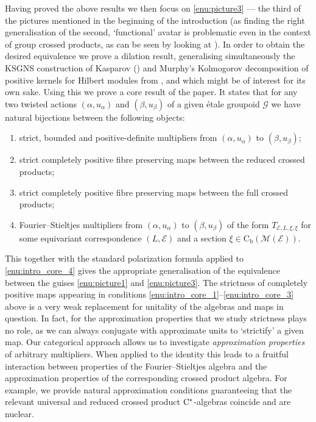\documentclass[11 pt, leqno]{amsart}
\numberwithin{equation}{section}
\theoremstyle{plain}
\theoremstyle{definition}
\newcommand*{\contb}{\mathrm{C_b}}%
\newcommand{\M}{\mathcal M}
\newcommand{\G}{\mathcal G} %
\newcommand{\EE}{\mathcal E}
\newcommand{\cst}{\ifmmode\mathrm{C}^*\else{$\mathrm{C}^*$}\fi}
\begin{document}
Having proved the above results we then focus on \ref{enu:picture3} --- the third of the pictures mentioned in the beginning of the introduction (as finding the right generalisation of the second, `functional' avatar is problematic even in the context of group crossed products, as can be seen by looking at \cite[Section 7.6]{Pedersen}). 
In order to obtain the desired equivalence we prove a dilation result, generalising simultaneously the KSGNS construction of Kasparov (\cite{Lance}) and Murphy's Kolmogorov decomposition of positive kernels for Hilbert modules from \cite{Mur}, and which might be of interest for its own sake. 
Using this we prove a core result of the paper.
It states that for any two twisted actions $(\alpha,u_{\alpha})$ and $(\beta, u_{\beta})$ of a given \'etale groupoid $\G$ we have natural bijections between the following objects: 
\begin{enumerate}
	\item\label{enu:intro_core_1} strict, bounded and positive-definite multipliers from $(\alpha,u_{\alpha})$ to $(\beta, u_{\beta})$;
    \item\label{enu:intro_core_2} strict completely positive fibre preserving maps between the reduced crossed products;
	\item\label{enu:intro_core_3} strict completely positive fibre preserving maps between the full crossed products;
	\item\label{enu:intro_core_4} Fourier--Stieltjes multipliers from $(\alpha,u_{\alpha})$ to $(\beta, u_{\beta})$ of the form $T_{\EE,L,\xi,\xi}$ %
	for some equivariant correspondence $(L,\EE)$ and a section $\xi\in \contb(\M(\EE))$.
\end{enumerate}	
This together with the standard polarization formula applied to \ref{enu:intro_core_4} gives  the appropriate generalisation of the equivalence between the guises \ref{enu:picture1} and \ref{enu:picture3}. 
The strictness of completely positive maps appearing in conditions \ref{enu:intro_core_1}--\ref{enu:intro_core_3} above is a very weak replacement for unitality of the algebras and maps in question. 
In fact, for the approximation properties that we study strictness plays no role, as we can always conjugate with approximate units to `strictify' a given map. 
Our categorical approach allows us to investigate \emph{approximation properties} of arbitrary multipliers. 
When applied to the identity this leads to a fruitful interaction between properties of the Fourier--Stieltjes algebra and the approximation properties of the corresponding crossed product algebra. 
For example, we provide natural approximation conditions guaranteeing that the relevant universal and reduced crossed product $\cst$-algebras coincide and are nuclear. 
\end{document}
